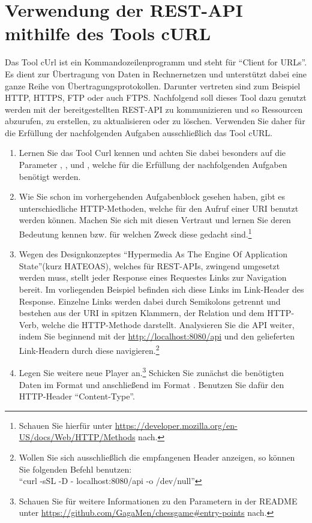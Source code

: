 \section{Verwendung der REST-API mithilfe des Tools cURL}
Das Tool cUrl ist ein Kommandozeilenprogramm und steht für \enquote{Client for \glspl{URL}}. Es dient zur Übertragung von Daten in Rechnernetzen und unterstützt dabei eine ganze Reihe von Übertragungsprotokollen. Darunter vertreten sind zum Beispiel HTTP, HTTPS, FTP oder auch FTPS. Nachfolgend soll dieses Tool dazu genutzt werden mit der bereitgestellten \gls{REST}-\gls{API} zu kommunizieren und so Ressourcen abzurufen, zu erstellen, zu aktualisieren oder zu löschen. Verwenden Sie daher für die Erfüllung der nachfolgenden Aufgaben ausschließlich das Tool cURL.
\begin{enumerate}
	\item Lernen Sie das Tool Curl kennen und achten Sie dabei besonders auf die Parameter , ,  und , welche für die Erfüllung der nachfolgenden Aufgaben benötigt werden.
	\item Wie Sie schon im vorhergehenden Aufgabenblock gesehen haben, gibt es unterschiedliche \gls{HTTP}-Methoden, welche für den Aufruf einer \gls{URI} benutzt werden können. Machen Sie sich mit diesen Vertraut und lernen Sie deren Bedeutung kennen bzw. für welchen Zweck diese gedacht sind.\footnote{Schauen Sie hierfür unter \url{https://developer.mozilla.org/en-US/docs/Web/HTTP/Methods} nach.}
	\item Wegen des Designkonzeptes \enquote{Hypermedia As The Engine Of Application State}(kurz HATEOAS), welches für \gls{REST}-\glspl{API}, zwingend umgesetzt werden muss, stellt jeder Response eines Requestes Links zur Navigation bereit. Im vorliegenden Beispiel befinden sich diese Links im Link-Header des Response. Einzelne Links werden dabei durch Semikolons getrennt und bestehen aus der \gls{URI} in spitzen Klammern, der Relation und dem \gls{HTTP}-Verb, welche die \gls{HTTP}-Methode darstellt. Analysieren Sie die \gls{API} weiter, indem Sie beginnend mit der \url{http://localhost:8080/api} und den gelieferten Link-Headern durch diese navigieren.\footnote{Wollen Sie sich ausschließlich die empfangenen Header anzeigen, so können Sie folgenden Befehl benutzen:\\\enquote{curl -sSL -D - localhost:8080/api -o /dev/null}}
	\item Legen Sie weitere neue Player an.\footnote{\label{foot:readmeEntryPoints}Schauen Sie für weitere Informationen zu den Parametern in der README unter \url{https://github.com/GagaMen/chessgame\#entry-points} nach.} Schicken Sie zunächst die benötigten Daten im Format  und anschließend im Format . Benutzen Sie dafür den \gls{HTTP}-Header \enquote{Content-Type}.

\end{enumerate}
